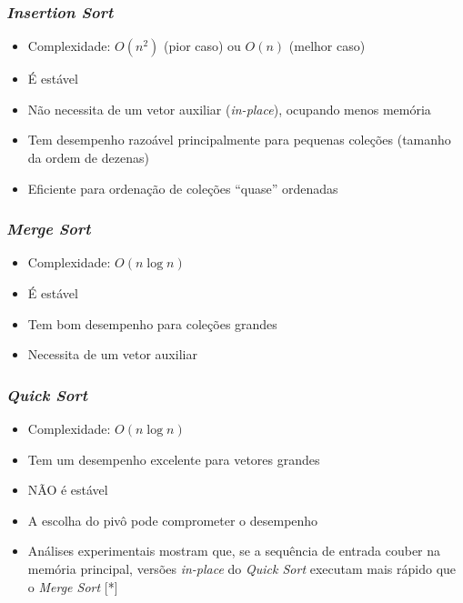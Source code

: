 \documentclass[aspectratio=169]{beamer}
\begin{document}
\begin{frame}\frametitle{\emph{Insertion Sort}}
\begin{itemize}
	\item Complexidade: $O(n^2)$ (pior caso) ou $O(n)$ (melhor caso)
	\item É estável
	\item Não necessita de um vetor auxiliar (\emph{in-place}), ocupando menos memória
	\item Tem desempenho razoável principalmente para pequenas coleções (tamanho da ordem de dezenas)
	\item Eficiente para ordenação de coleções ``quase'' ordenadas
\end{itemize}
\end{frame}

\begin{frame}\frametitle{\emph{Merge Sort}}
\begin{itemize}
	\item Complexidade: $O(n\log{n})$
	\item É estável
	\item Tem bom desempenho para coleções grandes
	\item Necessita de um vetor auxiliar
\end{itemize}
\end{frame}

\begin{frame}\frametitle{\emph{Quick Sort}}
\begin{itemize}
	\item Complexidade: $O(n\log{n})$
	\item Tem um desempenho excelente para vetores grandes
	\item NÃO é estável
	\item A escolha do pivô pode comprometer o desempenho
	\item Análises experimentais mostram que, se a sequência de entrada couber na memória principal, versões \emph{in-place} do \emph{Quick Sort}  executam mais rápido que o \emph{Merge Sort} [*]
\end{itemize}
\end{frame}
\end{document}
